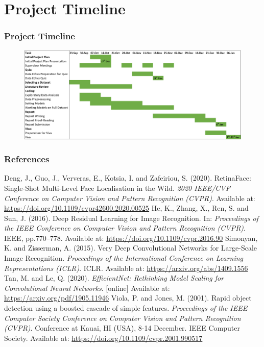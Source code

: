\documentclass[aspectratio=169]{beamer}
\begin{document}
\section{Project Timeline}
\begin{frame}
\frametitle{Project Timeline}
\begin{figure}
    \centering
    \includegraphics[scale=0.58]{fig6_timeline.png}
    \label{fig4}
\end{figure}
\end{frame}

\begin{frame}
\frametitle{References}
\footnotesize
Deng, J., Guo, J., Ververas, E., Kotsia, I. and Zafeiriou, S. (2020). RetinaFace: Single-Shot Multi-Level Face Localisation in the Wild. \textit{2020 IEEE/CVF Conference on Computer Vision and Pattern Recognition (CVPR)}. Available at: \color{blue}
\url{https://doi.org/10.1109/cvpr42600.2020.00525}
\newline \newline
\color{black}
He, K., Zhang, X., Ren, S. and Sun, J. (2016). Deep Residual Learning for Image Recognition. In: \textit{Proceedings of the IEEE Conference on Computer Vision and Pattern Recognition (CVPR)}. IEEE, pp.770–778. Available at: 
\color{blue}
\url{https://doi.org/10.1109/cvpr.2016.90}
\newline \newline
\color{black}
Simonyan, K. and Zisserman, A. (2015). Very Deep Convolutional Networks for Large-Scale Image Recognition. \textit{Proceedings of the International Conference on Learning Representations (ICLR)}. ICLR. Available at: 
\color{blue}
\url{https://arxiv.org/abs/1409.1556}
\newline \newline
\color{black}
Tan, M. and Le, Q. (2020). \textit{EfficientNet: Rethinking Model Scaling for Convolutional Neural Networks}. [online] Available at: 
\color{blue}
\url{https://arxiv.org/pdf/1905.11946}
\newline \newline
\color{black}
Viola, P. and Jones, M. (2001). Rapid object detection using a boosted cascade of simple features. \textit{Proceedings of the IEEE Computer Society Conference on Computer Vision and Pattern Recognition (CVPR)}. Conference at Kauai, HI (USA), 8-14 December. IEEE Computer Society. Available at: 
\color{blue}
\url{https://doi.org/10.1109/cvpr.2001.990517}
\newline \newline
\color{black}
\end{frame}
\end{document}
